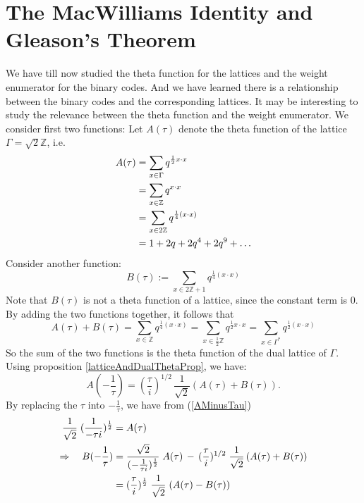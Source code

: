 \documentclass{article}
\numberwithin{equation}{theorem}
\numberwithin{figure}{theorem}
\newcommand{\Integer}{\ensuremath{\mathbb{Z}}}
\newcommand{\imaginary}{\ensuremath{i}}
\begin{document}
\section{The MacWilliams Identity and Gleason's Theorem}
We have till now studied the theta function for the lattices and the weight enumerator for the binary codes. And we have learned there is a relationship between the binary codes and the corresponding lattices. It may be interesting to study the relevance between the theta function and the weight enumerator.
We consider first two functions:
Let $A(\tau)$ denote the theta function of the lattice $\Gamma = \sqrt{2}\Integer$, i.e.
	\begin{align}
	A(\tau) &= \sum_{x \in \Gamma}q^{\frac{1}{2}x\cdot x} \notag\\
			&= \sum_{x \in \Integer}q^{x\cdot x} \notag\\
			&= \sum_{x \in 2\Integer}q^{\frac{1}{4}(x\cdot x)}\label{Afunc}\\
			&= 1 + 2q + 2q^4 + 2q^9 + \ldots \notag
	\end{align}
Consider another function:
\begin{equation}\label{Bfunc}
	B(\tau) := \sum_{x \in 2\Integer + 1}q^{\frac{1}{4}(x\cdot x)}
\end{equation}
Note that $B(\tau)$ is not a theta function of a lattice, since the constant term is 0.
By adding the two functions together, it follows that
\begin{equation}\label{sumABfuncEq}
	A(\tau) + B(\tau) = \sum_{x \in \Integer}q^{\frac{1}{4}(x\cdot x)} = \sum_{x \in \frac{1}{2}\Integer}q^{\frac{1}{2}x \cdot x}
			= \sum_{x\in \Gamma^{*}}q^{\frac{1}{2}(x\cdot x)}
\end{equation}
So the sum of the two functions is the theta function of the dual lattice of $\Gamma$. Using proposition \ref{latticeAndDualThetaProp}, we have:
\begin{equation}\label{AMinusTau}
	A(-\frac{1}{\tau}) = (\frac{\tau}{\imaginary})^{1/2} \, \frac{1}{\sqrt{2}}(A(\tau) + B(\tau)).
\end{equation}
By replacing the $\tau$ into $-\frac{1}{\tau}$, we have from (\ref{AMinusTau})
\begin{align}
	[A(-\frac{1}{\tau}) + B(-\frac{1}{\tau})]\; \frac{1}{\sqrt{2}}\; (\frac{1}{-\tau \imaginary})^{\frac{1}{2}} &= A(\tau) \notag \\
	\Rightarrow \quad B(-\frac{1}{\tau}) &= \frac{\sqrt{2}}{(-\frac{1}{\tau \imaginary})^{\frac{1}{2}}} \; A(\tau) \,- \,(\frac{\tau}{\imaginary})^{1/2} \; \frac{1}{\sqrt{2}}\,(A(\tau) + B(\tau))\notag\\
	&= (\frac{\tau}{\imaginary})^{\frac{1}{2}} \;\frac{1}{\sqrt{2}}\;(A(\tau) - B(\tau)) \label{BMinusTau}
\end{align}
\end{document}
